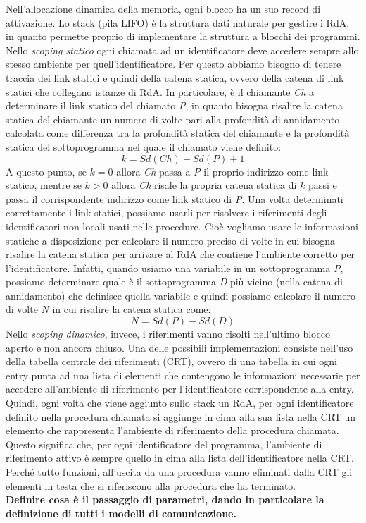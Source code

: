\documentclass[a4paper,oneside,titlepage]{book}
\begin{document}
Nell'allocazione dinamica della memoria, ogni blocco ha un suo record di attivazione. Lo stack (pila LIFO) è la struttura dati naturale per gestire i RdA, in quanto permette proprio di implementare la struttura a blocchi dei programmi. Nello \emph{scoping statico} ogni chiamata ad un identificatore deve accedere sempre allo stesso ambiente per quell'identificatore. Per questo abbiamo bisogno di tenere traccia dei link statici e quindi della catena statica, ovvero della catena di link statici che collegano istanze di RdA. In particolare, è il chiamante \textit{Ch} a determinare il link statico del chiamato \textit{P}, in quanto bisogna risalire la catena statica del chiamante un numero di volte pari alla profondità di annidamento calcolata come differenza tra la profondità statica del chiamante e la profondità statica del sottoprogramma nel quale il chiamato viene definito:
\[ k = Sd(Ch) - Sd(P) + 1 \]
A questo punto, se $k=0$ allora \textit{Ch} passa a \textit{P} il proprio indirizzo come link statico, mentre se $k>0$ allora \textit{Ch} risale la propria catena statica di $k$ passi e passa il corrispondente indirizzo come link statico di \textit{P}. Una volta determinati correttamente i link statici, possiamo usarli per risolvere i riferimenti degli identificatori non locali usati nelle procedure. Cioè vogliamo usare le informazioni statiche a disposizione per calcolare il numero preciso di volte in cui bisogna risalire la catena statica per arrivare al RdA che contiene l'ambiente corretto per l'identificatore. Infatti, quando usiamo una variabile in un sottoprogramma \textit{P}, possiamo determinare quale è il sottoprogramma \textit{D} più vicino (nella catena di annidamento) che definisce quella variabile e quindi possiamo calcolare il numero di volte $N$ in cui risalire la catena statica come:
\[ N = Sd(P) - Sd(D) \]
Nello \emph{scoping dinamico}, invece, i riferimenti vanno risolti nell'ultimo blocco aperto e non ancora chiuso. Una delle possibili implementazioni consiste nell'uso della tabella centrale dei riferimenti (CRT), ovvero di una tabella in cui ogni entry punta ad una lista di elementi che contengono le informazioni necessarie per accedere all'ambiente di riferimento per l'identificatore corrispondente alla entry. Quindi, ogni volta che viene aggiunto sullo stack un RdA, per ogni identificatore definito nella procedura chiamata si aggiunge in cima alla sua lista nella CRT un elemento che rappresenta l'ambiente di riferimento della procedura chiamata. Questo significa che, per ogni identificatore del programma, l'ambiente di riferimento attivo è sempre quello in cima alla lista dell'identificatore nella CRT. Perché tutto funzioni, all'uscita da una procedura vanno eliminati dalla CRT gli elementi in testa che si riferiscono alla procedura che ha terminato.
\bigskip
\\
\textbf{Definire cosa è il passaggio di parametri, dando in particolare la definizione di tutti i modelli di comunicazione.}
\end{document}
